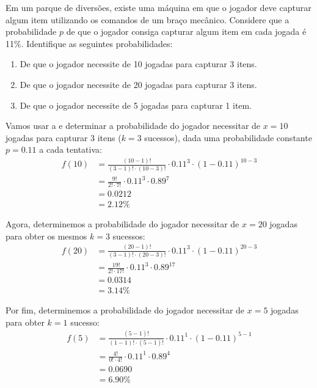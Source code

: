 \begin{eg}
Em um parque de diversões, existe uma máquina em que o jogador deve capturar
algum item utilizando os comandos de um braço mecânico. Considere que a
probabilidade $p$ de que o jogador consiga capturar algum item em cada jogada é
11\%. Identifique as seguintes probabilidades:

\begin{enumerate}[label=\alph*)]
    \item De que o jogador necessite de 10 jogadas para capturar 3 itens.
    \item De que o jogador necessite de 20 jogadas para capturar 3 itens.
    \item De que o jogador necessite de 5 jogadas para capturar 1 item.
\end{enumerate}
\end{eg}

\begin{sol}
Vamos usar a  e determinar a probabilidade do
jogador necessitar de $x=10$ jogadas para capturar 3 itens ($k=3$ sucessos),
dada uma probabilidade constante $p=0.11$ a cada tentativa:
\begin{align*}
f(10) &= \frac{(10-1)!}{(3-1)! \cdot (10-3)!} \cdot 0.11^{3} \cdot (1-0.11)^{10-3} \\
      &= \frac{9!}{2! \cdot 7!} \cdot 0.11^{3} \cdot 0.89^{7} \\
      &= 0.0212 \\
      &= 2.12 \%
\end{align*}

Agora, determinemos a probabilidade do jogador necessitar de $x=20$ jogadas
para obter os mesmos $k=3$ sucessos:
\begin{align*}
f(20) &= \frac{(20-1)!}{(3-1)! \cdot (20-3)!} \cdot 0.11^{3} \cdot (1-0.11)^{20-3} \\
      &= \frac{19!}{2! \cdot 17!} \cdot 0.11^{3} \cdot 0.89^{17} \\
      &= 0.0314 \\
      &= 3.14 \%
\end{align*}

Por fim, determinemos a probabilidade do jogador necessitar de $x=5$ jogadas
para obter $k=1$ sucesso:
\begin{align*}
f(5) &= \frac{(5-1)!}{(1-1)! \cdot (5-1)!} \cdot 0.11^{1} \cdot (1-0.11)^{5-1} \\
      &= \frac{4!}{0! \cdot 4!} \cdot 0.11^{1} \cdot 0.89^{4} \\
      &= 0.0690 \\
      &= 6.90 \%
\end{align*}
\end{sol}

